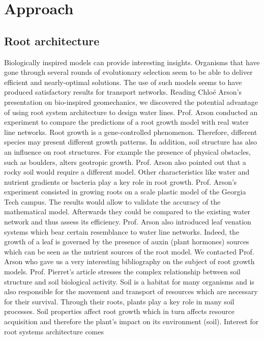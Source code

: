 ﻿\chapter{Approach}
\label{capitolo3}
\thispagestyle{empty}


\section{Root architecture}
\parindent Biologically inspired models can provide interesting insights. Organisms that have gone
through several rounds of evolutionary selection seem to be able to deliver efficient and
nearly-optimal solutions. The use of such models seems to have produced satisfactory
results for transport networks.
Reading Chlo\'e Arson’s presentation on bio-inspired geomechanics, we discovered the
potential advantage of using root system architecture to design water lines. Prof. Arson
conducted an experiment to compare the predictions of a root growth model with real
water line networks. Root growth is a gene-controlled phenomenon. Therefore, different
species may present different growth patterns. In addition, soil structure has also an influence
on root structures. For example the presence of physical obstacles, such as boulders,
alters geotropic growth. Prof. Arson also pointed out that a rocky soil would require a different model. Other characteristics like water and nutrient gradients or bacteria play
a key role in root growth. Prof. Arson’s experiment consisted in growing roots on a
scale plastic model of the Georgia Tech campus. The results would allow to validate the
accuracy of the mathematical model. Afterwards they could be compared to the existing
water network and thus assess its efficiency. Prof. Arson also introduced leaf venation
systems which bear certain resemblance to water line networks. Indeed, the growth of a
leaf is governed by the presence of auxin (plant hormones) sources which can be seen as
the nutrient sources of the root model.
We contacted Prof. Arson who gave us a very interesting bibliography on the subject
of root growth models. Prof. Pierret’s article stresses the complex relationship between
soil structure and soil biological activity. Soil is a habitat for many organisms and is
also responsible for the movement and transport of resources which are necessary for
their survival. Through their roots, plants play a key role in many soil processes. Soil
properties affect root growth which in turn affects resource acquisition and therefore the
plant’s impact on its environment (soil). Interest for root systems architecture comes
